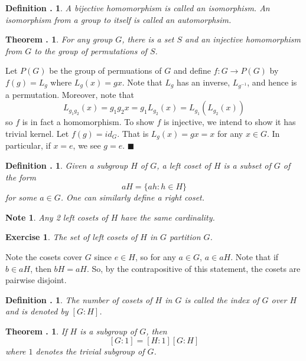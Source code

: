\documentclass[twoside]{report}
\newcommand{\done}{$\blacksquare$}
\newcounter{Lecture}
\theoremstyle{myts}
\newcounter{c}[Lecture]
\newtheorem{dfn}[c]{Definition \arabic{Lecture}.}
\newtheorem{thm}[c]{Theorem \arabic{Lecture}.}
\newtheorem*{nte}{Note}
\newcounter{ex}
\newtheorem{exc}[ex]{Exercise }
\newenvironment{prf}{
  \noindent\begin{mdframed}[style=prf]}{\end{mdframed} \vspace{1em}
}
\begin{document}
\begin{dfn}
  A bijective homomorphism is called an \emph{isomorphism}. An isomorphism from a group to itself is called an \emph{automorphsim}.
\end{dfn}

\begin{thm}
  For any group $G$, there is a set $S$ and an injective homomorphism from $G$ to the group of permutations of $S$.
\end{thm}

\begin{prf}
  Let $P(G)$ be the group of permuations of $G$ and define $f:G\to P(G)$ by $f(g)=L_g$ where $L_g(x)=gx$. Note that $L_g$ has an inverse, $L_{g^{-1}}$, and hence is a permutation. Moreover, note that
  \[
    L_{g_1g_2}(x) = g_1g_2x = g_1L_{g_2}(x) = L_{g_1}(L_{g_2}(x))
  \]
  so $f$ is in fact a homomorphism. To show $f$ is injective, we intend to show it has trivial kernel. Let $f(g)=id_G$. That is $L_g(x)=gx=x$ for any $x\in G$. In particular, if $x=e$, we see $g=e$. \done
\end{prf}

\begin{dfn}
  Given a subgroup $H$ of $G$, a \emph{left coset} of $H$ is a subset of $G$ of the form
  \[
    aH = \{ ah : h\in H  \}
  \]
  for some $a\in G$. One can similarly define a \emph{right coset}.
\end{dfn}

\begin{nte}
  Any 2 left cosets of $H$ have the same cardinality.
\end{nte}

\begin{exc}
  The set of left cosets of $H$ in $G$ partition $G$.
\end{exc}

\begin{prf}
  Note the cosets cover $G$ since $e\in H$, so for any $a\in G$, $a\in aH$. Note that if $b\in aH$, then $bH=aH$. So, by the contrapositive of this statement, the cosets are pairwise disjoint.
\end{prf}

\begin{dfn}
  The number of cosets of $H$ in $G$ is called the \emph{index} of $G$ over $H$ and is denoted by $[G:H]$.
\end{dfn}

\begin{thm}
  If $H$ is a subgroup of $G$, then
  \[
    [G:1] = [H:1][G:H]
  \]
  where $1$ denotes the trivial subgroup of $G$.
\end{thm}
\end{document}

